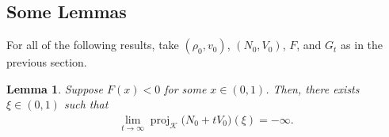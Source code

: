 \documentclass[10pt,a4paper]{amsart}
\newtheorem{lemma}[thm]{Lemma}
\numberwithin{equation}{section}
\DeclareMathOperator{\proj}{proj}
\begin{document}
\subsection{Some Lemmas}
For all of the following results, take $(\rho_0,v_0)$, $(N_0,V_0)$, $F$, and $G_t$ as in the previous section. 
\begin{lemma}\label{divergence-of-projection}
    Suppose $F(x)<0$ for some $x\in(0,1)$. Then, there exists $\xi\in(0,1)$ such that 
    \begin{align*}
        \lim_{t\to\infty}\proj_{\mathcal{K}}\Big(N_0+tV_0\Big)(\xi)=-\infty.
    \end{align*}
\end{lemma}
\end{document}
